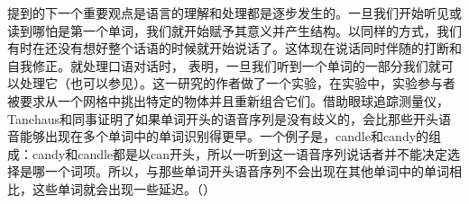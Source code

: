  \citet{SW2011a} 提到的下一个重要观点是语言的理解和处理都是逐步发生的。一旦我们开始听见或读到哪怕是第一个单词，我们就开始赋予其意义并产生结构。以同样的方式，我们有时在还没有想好整个话语的时候就开始说话了。这体现在说话同时伴随的打断和自我修正\citep{CW98a,CFT2002a}。就处理口语对话时， \citet{TSKES96a}表明，一旦我们听到一个单词的一部分我们就可以处理它（也可以参见\citealp{Marslen-Wilson75a}）。这一研究的作者做了一个实验，在实验中，实验参与者被要求从一个网格中挑出特定的物体并且重新组合它们。借助眼球追踪测量仪，Tanehaus和同事证明了如果单词开头的语音序列是没有歧义的，会比那些开头语音能够出现在多个单词中的单词识别得更早。一个例子是，candle和candy的组成：candy和candle都是以can开头，所以一听到这一语音序列说话者并不能决定选择是哪一个词项。所以，与那些单词开头语音序列不会出现在其他单词中的单词相比，这些单词就会出现一些延迟。（\citep[]{TSKES95a}）

